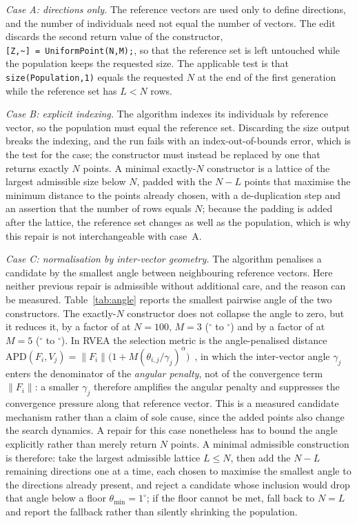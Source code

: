 \documentclass{SCIS2026}
\begin{document}
\emph{Case A: directions only.} The reference vectors are used only to define directions, and the number of individuals need not equal the number of vectors. The edit discards the second return value of the constructor, \texttt{[Z,\textasciitilde]~=~UniformPoint(N,M);}, so that the reference set is left untouched while the population keeps the requested size. The applicable test is that \texttt{size(Population,1)} equals the requested $N$ at the end of the first generation while the reference set has $L<N$ rows.

\emph{Case B: explicit indexing.} The algorithm indexes its individuals by reference vector, so the population must equal the reference set. Discarding the size output breaks the indexing, and the run fails with an index-out-of-bounds error, which is the test for the case; the constructor must instead be replaced by one that returns exactly $N$ points. A minimal exactly-$N$ constructor is a lattice of the largest admissible size below $N$, padded with the $N-L$ points that maximise the minimum distance to the points already chosen, with a de-duplication step and an assertion that the number of rows equals $N$; because the padding is added after the lattice, the reference set changes as well as the population, which is why this repair is not interchangeable with case~A.

\emph{Case C: normalisation by inter-vector geometry.} The algorithm penalises a candidate by the smallest angle between neighbouring reference vectors. Here neither previous repair is admissible without additional care, and the reason can be measured. Table~\ref{tab:angle} reports the smallest pairwise angle of the two constructors. The exactly-$N$ constructor does not collapse the angle to zero, but it reduces it, by a factor of \angRatioThree{} at $N=100$, $M=3$ (\angNbiThree$^\circ$ to \angMudThree$^\circ$) and by a factor of \angRatioFive{} at $M=5$ (\angNbiFive$^\circ$ to \angMudFive$^\circ$). In RVEA the selection metric is the angle-penalised distance $\mathrm{APD}(F_i,V_j)=\|F_i\|\big(1+M(\theta_{i,j}/\gamma_j)^{\alpha}\big)$~\cite{3}, in which the inter-vector angle $\gamma_j$ enters the denominator of the \emph{angular penalty}, not of the convergence term $\|F_i\|$: a smaller $\gamma_j$ therefore amplifies the angular penalty and suppresses the convergence pressure along that reference vector. This is a measured candidate mechanism rather than a claim of sole cause, since the added points also change the search dynamics. A repair for this case nonetheless has to bound the angle explicitly rather than merely return $N$ points. A minimal admissible construction is therefore: take the largest admissible lattice $L\le N$, then add the $N-L$ remaining directions one at a time, each chosen to maximise the smallest angle to the directions already present, and reject a candidate whose inclusion would drop that angle below a floor $\theta_{\min}=1^\circ$; if the floor cannot be met, fall back to $N=L$ and report the fallback rather than silently shrinking the population.
\end{document}
